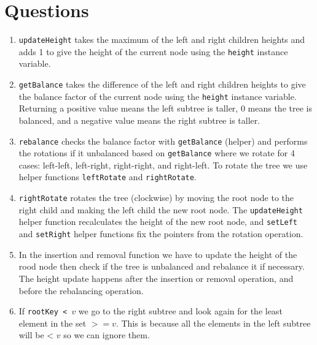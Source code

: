 \documentclass[../main.tex]{subfiles}
\begin{document}
\pagestyle{fancy}



\renewcommand{\thefigure}{\arabic{figure}}
\section*{Questions}

\begin{enumerate}
    \item \texttt{updateHeight} takes the maximum of the left and right children heights and adds 1
        to give the height of the current node using the \texttt{height} instance variable. 

    \item \texttt{getBalance} takes the difference of the left and right children heights to give
    the balance factor of the current node using the \texttt{height} instance variable. Returning a
    positive value means the left subtree is taller, 0 means the tree is balanced, and a negative
    value means the right subtree is taller.

    \item \texttt{rebalance} checks the balance factor with \texttt{getBalance} (helper) and
    performs the rotations if it unbalanced based on \texttt{getBalance} where we rotate for 4
    cases: left-left, left-right, right-right, and right-left. To rotate the tree we use helper
    functions \texttt{leftRotate} and \texttt{rightRotate}.

    \item \texttt{rightRotate} rotates the tree (clockwise) by moving the root node to the right
    child and making the left child the new root node. The \texttt{updateHeight} helper function
    recalculates the height of the new root node, and \texttt{setLeft} and \texttt{setRight} helper
    functions fix the pointers from the rotation operation.

    \item In the insertion and removal function we have to update the height of the rood node then
    check if the tree is unbalanced and rebalance it if necessary. The height update
    happens after the insertion or removal operation, and before the rebalancing operation.

    \item If \texttt{rootKey < $v$} we go to the right subtree and look again for the least element
    in the set $>= v$. This is because all the elements in the left subtree will be
    $\texttt{< $v$}$ so we can ignore them.
    

\end{enumerate}
\end{document}
